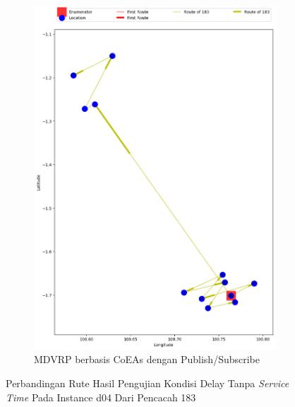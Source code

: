 \begin{figure}[H]\ContinuedFloat
	\centering
	\begin{subfigure}[t]{\textwidth}
		\centering
		\includegraphics[width=\textwidth]{Resources/Images/delayed_5/real_m15_n100_delayed_5_183_pubsub_coes}
		\caption{MDVRP berbasis CoEAs dengan Publish/Subscribe}
		\label{fig:real_m15_n100_delayed_5_183_pubsub_coes}
	\end{subfigure}
	\caption{Perbandingan Rute Hasil Pengujian Kondisi Delay Tanpa \textit{Service Time} Pada Instance d04 Dari Pencacah 183}
	\label{fig:real_m15_n100_delayed_5_183_contd}
\end{figure}


